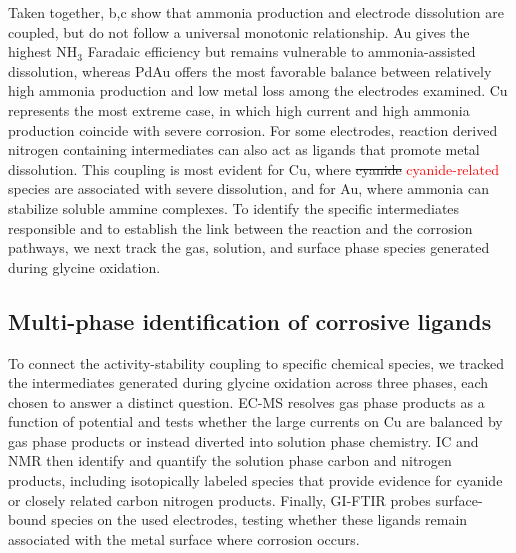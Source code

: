 \documentclass[twoside,twocolumn,9pt]{article}
\begin{document}
Taken together, b,c show that ammonia production and electrode dissolution are coupled, but do not follow a universal monotonic relationship. Au gives the highest NH$_3$ Faradaic efficiency but remains vulnerable to ammonia-assisted dissolution, whereas PdAu offers the most favorable balance between relatively high ammonia production and low metal loss among the electrodes examined. Cu represents the most extreme case, in which high current and high ammonia production coincide with severe corrosion. For some electrodes, reaction derived nitrogen containing intermediates can also act as ligands that promote metal dissolution. This coupling is most evident for Cu, where \sout{cyanide} \textcolor{red}{cyanide-related} species are associated with severe dissolution, and for Au, where ammonia can stabilize soluble ammine complexes. To identify the specific intermediates responsible and to establish the link between the reaction and the corrosion pathways, we next track the gas, solution, and surface phase species generated during glycine oxidation.


\subsection{Multi-phase identification of corrosive ligands}
\label{sec:intermediates}

To connect the activity-stability coupling to specific chemical species, we tracked the intermediates generated during glycine oxidation across three phases, each chosen to answer a distinct question. EC-MS resolves gas phase products as a function of potential and tests whether the large currents on Cu are balanced by gas phase products or instead diverted into solution phase chemistry. IC and NMR then identify and quantify the solution phase carbon and nitrogen products, including isotopically labeled species that provide evidence for cyanide or closely related carbon nitrogen products. Finally, GI-FTIR probes surface-bound species on the used electrodes, testing whether these ligands remain associated with the metal surface where corrosion occurs.
\end{document}
